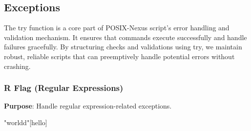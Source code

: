 \subsection{Exceptions}
The try function is a core part of POSIX-Nexus script's error handling and validation mechanism.
It ensures that commands execute successfully and handle failures gracefully.
By structuring checks and validations using try, we maintain robust, reliable scripts that can preemptively handle potential errors without crashing.

\subsubsection{R Flag (Regular Expressions)}
\textbf{Purpose}: Handle regular expression-related exceptions.

\nexColorBox"worldd"[hello]
